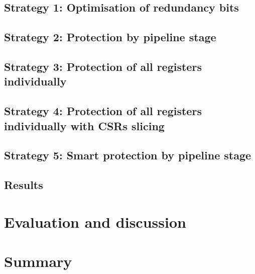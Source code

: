 \subsection{Strategy 1: Optimisation of redundancy bits}

\subsection{Strategy 2: Protection by pipeline stage}

\subsection{Strategy 3: Protection of all registers individually}

\subsection{Strategy 4: Protection of all registers individually with CSRs slicing}

\subsection{Strategy 5: Smart protection by pipeline stage}

\subsection{Results}


\section{Evaluation and discussion}
\label{section:chap6_discussion}


\section{Summary}


